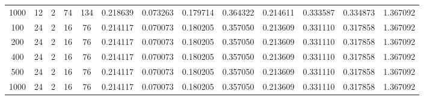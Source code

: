 \begin{table}[h]
\begin{tabular}{ccccccccccccc}
1000 & 12 & 2 & 74 & 134 & 0.218639 & 0.073263 & 0.179714 & 0.364322 & 0.214611 & 0.333587 & 0.334873 & 1.367092 \\
100 & 24 & 2 & 16 & 76 & 0.214117 & 0.070073 & 0.180205 & 0.357050 & 0.213609 & 0.331110 & 0.317858 & 1.367092 \\
200 & 24 & 2 & 16 & 76 & 0.214117 & 0.070073 & 0.180205 & 0.357050 & 0.213609 & 0.331110 & 0.317858 & 1.367092 \\
400 & 24 & 2 & 16 & 76 & 0.214117 & 0.070073 & 0.180205 & 0.357050 & 0.213609 & 0.331110 & 0.317858 & 1.367092 \\
500 & 24 & 2 & 16 & 76 & 0.214117 & 0.070073 & 0.180205 & 0.357050 & 0.213609 & 0.331110 & 0.317858 & 1.367092 \\
1000 & 24 & 2 & 16 & 76 & 0.214117 & 0.070073 & 0.180205 & 0.357050 & 0.213609 & 0.331110 & 0.317858 & 1.367092 \\
\bottomrule
\end{tabular}
\end{table}
